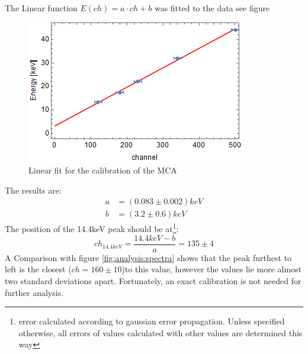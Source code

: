 The Linear function $E(ch)=a\cdot ch+b$ was fitted to the data see figure
\begin{figure}[H]
\centering
\includegraphics[width=1.0\linewidth]{../results/calibration/fit}
\caption[MCA calibration]{Linear fit for the calibration of the MCA}
\label{fig:calibrationfit}
\end{figure}
The results are:
\begin{equation}
\begin{aligned}
	a &= (0.083\pm0.002)keV\\
	b &= (3.2 \pm 0.6)keV
\end{aligned}
\end{equation}
The position of the 14.4keV peak should be at\footnote{error calculated according to gaussian error propagation. Unless specified otherwise, all errors of values calculated with other values are determined this way}:
\begin{equation}
ch_{14.4keV}=\frac{14.4keV-b}{a}=135\pm4
\end{equation}
A Comparison with figure \ref{fig:analysis:spectra} shows that the peak furthest to left is the closest ($ch=160\pm10$)to this value, however the values lie more almost two standard deviations apart. Fortunately, an exact calibration is not needed for further analysis.

